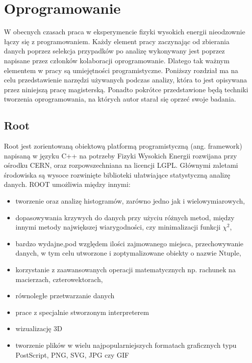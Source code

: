 \chapter{Oprogramowanie}
W obecnych czasach praca w eksperymencie fizyki wysokich energii nieodzownie łączy się z programowaniem. Każdy element pracy zaczynając od zbierania danych poprzez selekcja przypadków po analizę wykonywany jest poprzez napisane przez członków kolaboracji oprogramowanie. Dlatego tak ważnym elementem w pracy są umiejętności programistyczne. Poniższy rozdział ma na celu przedstawienie narzędzi używanych podczas analizy, która to jest opisywana przez niniejszą pracę magisterską. Ponadto pokrótce przedstawione będą techniki tworzenia oprogramowania, na których autor starał się oprzeć swoje badania.

\section{Root}
Root \cite{ROOT} jest zorientowaną obiektową platformą programistyczną (ang. framework) napisaną w języku C++ na potrzeby Fizyki Wysokich Energii rozwijana przy ośrodku CERN, oraz rozpowszechniana na licencji LGPL. Głównymi zaletami środowiska są wysoce rozwinięte biblioteki ułatwiające statystyczną analizę danych. ROOT umożliwia między innymi:
\begin{itemize}
 \item tworzenie oraz analizę histogramów, zarówno jedno jak i wielowymiarowych,
 \item dopasowywania krzywych do danych przy użyciu różnych metod, między innymi metody największej wiarygodności, czy minimalizacji funkcji $\chi^2 $,
\item bardzo wydajne,pod względem ilości zajmowanego miejsca, przechowywanie danych, w tym celu utworzone i zoptymalizowane obiekty o nazwie Ntuple,
\item korzystanie z zaawansowanych operacji matematycznych np. rachunek na macierzach, czterowektorach,
\item równoległe przetwarzanie danych
\item prace z specjalnie stworzonym interpreterem 
\item wizualizację 3D
\item tworzenie plików w wielu najpopularniejszych formatach graficznych typu  PostScript, PNG, SVG, JPG czy GIF
 \end{itemize}
